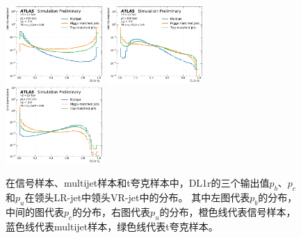 \begin{figure}[h]
    \includegraphics[width=0.33\textwidth]{figuresXbb/samples/inputs_aux/dl1r_pb_1_norm.pdf}
    \includegraphics[width=0.33\textwidth]{figuresXbb/samples/inputs_aux/dl1r_pc_1_norm.pdf}
    \includegraphics[width=0.33\textwidth]{figuresXbb/samples/inputs_aux/dl1r_pu_1_norm.pdf}
  \caption{
  在信号样本、multijet样本和t夸克样本中，DL1r的三个输出值$p_b$、$p_c$和$p_u$在领头LR-jet中领头VR-jet中的分布。
其中左图代表$p_b$的分布，中间的图代表$p_c$的分布，右图代表$p_u$的分布，橙色线代表信号样本，蓝色线代表multijet样本，绿色线代表t夸克样本。
}
  \label{fig:DL1RLD}
\end{figure}

